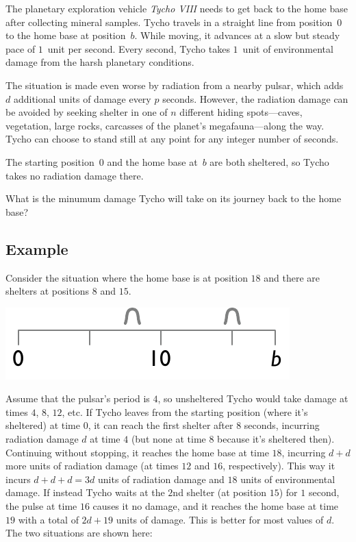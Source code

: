 

\noindent
The planetary exploration vehicle \emph{Tycho VIII} needs to get back to the home base after collecting mineral samples.
Tycho travels in a straight line from position~$0$ to the home base at position~$b$.
While moving, it advances at a slow but steady pace of $1$~unit per second.
Every second, Tycho takes $1$~unit of environmental damage from the harsh planetary conditions.

The situation is made even worse by radiation from a nearby pulsar, which adds $d$ additional units of damage every $p$ seconds.
However, the radiation damage can be avoided by seeking shelter in one of $n$ different hiding spots---caves, vegetation, large rocks, carcasses of the planet's megafauna---along the way.
Tycho can choose to stand still at any point for any integer number of seconds.

The starting position~$0$ and the home base at~$b$ are both sheltered, so Tycho takes no radiation damage there.

\medskip
What is the minumum damage Tycho will take on its journey back to the home base?

\subsection*{Example}

Consider the situation where the home base is at position $18$ and there are shelters at positions $8$ and $15$.

\includegraphics[width=.3\textwidth]{img/samplesetup}

Assume that the pulsar's period is $4$, so unsheltered Tycho would take damage at times $4$, $8$, $12$, etc.
If Tycho leaves from the starting position (where it's sheltered) at time $0$, it can reach the first shelter after $8$ seconds, incurring radiation damage $d$ at time $4$ (but none at time $8$ because it's sheltered then).
Continuing without stopping, it reaches the home base at time $18$, incurring $d+d$ more units of radiation damage (at times $12$ and $16$, respectively).
This way it incurs $d+d+d=3d$ units of radiation damage and $18$ units of environmental damage.
If instead Tycho waits at the $2$nd shelter (at position $15$) for $1$ second, the pulse at time $16$ causes it no damage, and it reaches the home base at time $19$ with a total of $2d + 19$ units of damage.
This is better for most values of $d$.
The two situations are shown here:

